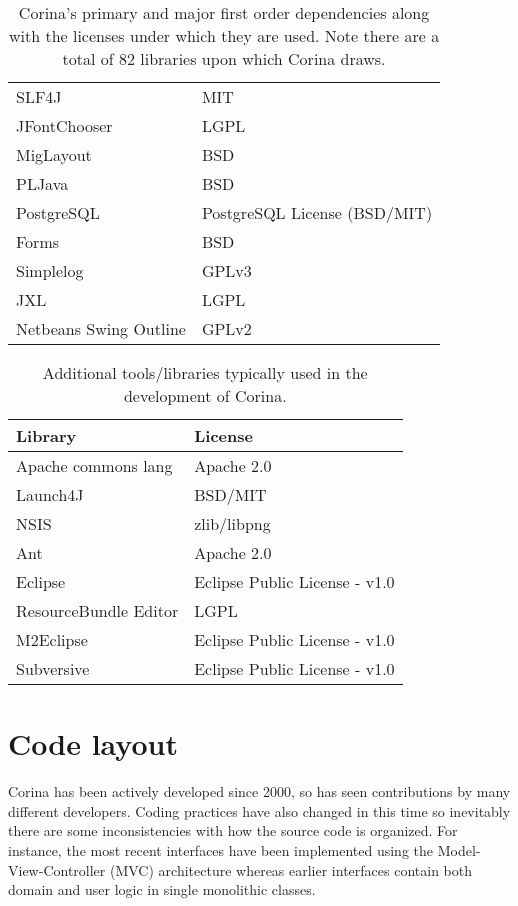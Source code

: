\begin{table*}[htbp]
\begin{tabular*}{0.6\textwidth}{ll}
SLF4J & MIT\\
JFontChooser & LGPL\\
MigLayout & BSD\\
PLJava & BSD\\
PostgreSQL & PostgreSQL License (BSD/MIT)\\
Forms & BSD\\
Simplelog & GPLv3\\
JXL & LGPL\\
Netbeans Swing Outline & GPLv2\\
\bottomrule
\end{tabular*}
\captionsetup{width=0.6\textwidth}
\caption{Corina's primary and major first order dependencies along with the licenses under which they are used.  Note there are a total of 82 libraries upon which Corina draws.}
\label{tbl:desktopDependencies}
\end{table*}


\begin{table*}[htbp]
\centering
\label{tbl:developDependencies}
\begin{tabular*}{0.6\textwidth}{ll}
\toprule
Library & License \\
\midrule
Apache commons lang & Apache 2.0 \\
Launch4J & BSD/MIT \\
NSIS & zlib/libpng \\
Ant & Apache 2.0 \\
Eclipse & Eclipse Public License - v1.0\\
ResourceBundle Editor & LGPL \\
M2Eclipse & Eclipse Public License - v1.0\\
Subversive & Eclipse Public License - v1.0\\
\bottomrule
\end{tabular*}
\captionsetup{width=0.6\textwidth}
\caption{Additional tools/libraries typically used in the development of Corina.}
\end{table*}

\section{Code layout}
Corina has been actively developed since 2000, so has seen contributions by many different developers.  Coding practices have also changed in this time so inevitably there are some inconsistencies with how the source code is organized.  For instance, the most recent interfaces have been implemented using the Model-View-Controller (MVC) architecture whereas earlier interfaces contain both domain and user logic in single monolithic classes.  

